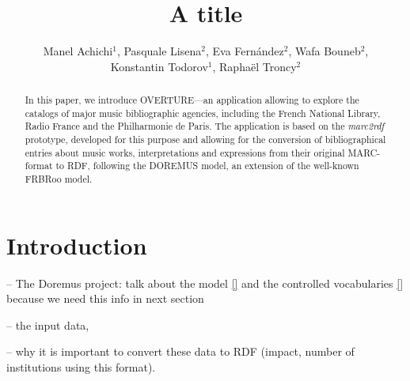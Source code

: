 \documentclass[runningheads,a4paper]{llncs}
\begin{document}
\title{A title}


\author{Manel Achichi$^1$, Pasquale Lisena$^2$, Eva Fern\'{a}ndez$^2$, Wafa Bouneb$^2$, \\ Konstantin Todorov$^1$, Rapha\"{e}l Troncy$^2$}

\maketitle


\begin{abstract}
In this paper, we introduce OVERTURE---an application allowing to explore the catalogs of major music bibliographic agencies, including the French National Library, Radio France and the Philharmonie de Paris. The application is based on the {\it marc2rdf} prototype, developed for this purpose and allowing for the conversion of bibliographical entries about music works, interpretations and expressions from their original MARC-format to RDF, following the DOREMUS model, an extension of the well-known FRBRoo model.
\end{abstract}


\section{Introduction}
\label{sec:introduction}

-- The Doremus project: talk about the model \ref{} and the controlled vocabularies \ref{} because we need this info in next section

-- the input data,

-- why it is important to convert these data to RDF (impact, number of institutions using this format).

\end{document}
